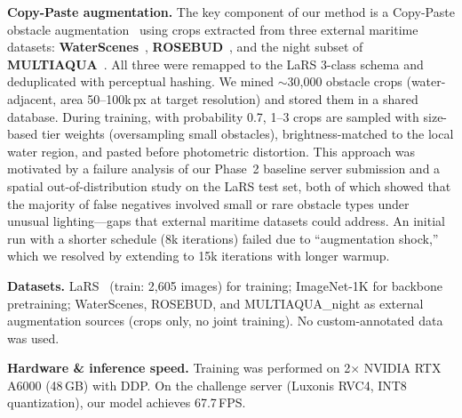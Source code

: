 \documentclass[10pt,twocolumn,letterpaper]{article}
\begin{document}
\vspace{0.3em}
\noindent\textbf{Copy-Paste augmentation.}
The key component of our method is a Copy-Paste obstacle augmentation~\cite{ghiasi2021copypaste} using crops extracted from three external maritime datasets: \textbf{WaterScenes}~\cite{yao2024waterscenes}, \textbf{ROSEBUD}~\cite{lambert2022rosebud}, and the night subset of \textbf{MULTIAQUA}~\cite{iancu2024multiaqua}. All three were remapped to the LaRS 3-class schema and deduplicated with perceptual hashing. We mined ${\sim}$30{,}000 obstacle crops (water-adjacent, area 50--100k\,px at target resolution) and stored them in a shared database. During training, with probability 0.7, 1--3 crops are sampled with size-based tier weights (oversampling small obstacles), brightness-matched to the local water region, and pasted before photometric distortion. This approach was motivated by a failure analysis of our Phase~2 baseline server submission and a spatial out-of-distribution study on the LaRS test set, both of which showed that the majority of false negatives involved small or rare obstacle types under unusual lighting---gaps that external maritime datasets could address. An initial run with a shorter schedule (8k iterations) failed due to ``augmentation shock,'' which we resolved by extending to 15k iterations with longer warmup.

\vspace{0.3em}
\noindent\textbf{Datasets.}
LaRS~\cite{zust2023lars} (train: 2{,}605 images) for training; ImageNet-1K for backbone pretraining; WaterScenes, ROSEBUD, and MULTIAQUA\_night as external augmentation sources (crops only, no joint training). No custom-annotated data was used.

\vspace{0.3em}
\noindent\textbf{Hardware \& inference speed.}
Training was performed on 2$\times$ NVIDIA RTX A6000 (48\,GB) with DDP. On the challenge server (Luxonis RVC4, INT8 quantization), our model achieves 67.7\,FPS.
\end{document}
